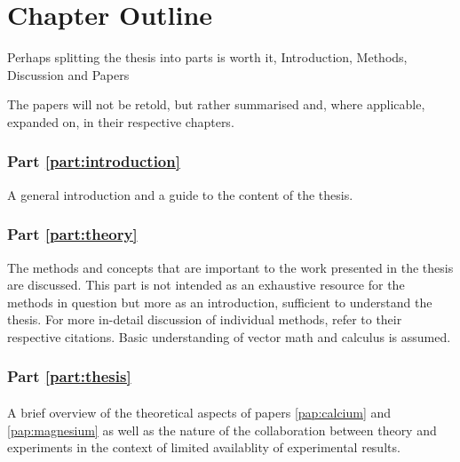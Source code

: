 \section{Chapter Outline}
\label{sec:chapters}

Perhaps splitting the thesis into parts is worth it, Introduction, Methods, Discussion and Papers

The papers will not be retold, but rather summarised and, where applicable, expanded on, in their respective chapters.

\subsubsection{Part \ref{part:introduction}}
A general introduction and a guide to the content of the thesis.

\subsubsection{Part \ref{part:theory}}
The methods and concepts that are important to the work presented in the thesis are discussed.
This part is not intended as an exhaustive resource for the methods in question but more as an introduction, sufficient to understand the thesis.
For more in-detail discussion of individual methods, refer to their respective citations.
Basic understanding of vector math and calculus is assumed.

\paragraph{}
\placeholder

\paragraph{}
\placeholder

\paragraph{}
\placeholder

\subsubsection{Part \ref{part:thesis}}
\placeholder

\paragraph{}
A brief overview of the theoretical aspects of papers \ref{pap:calcium} and \ref{pap:magnesium} as well as the nature of the collaboration between theory and experiments in the context of limited availablity of experimental results.

